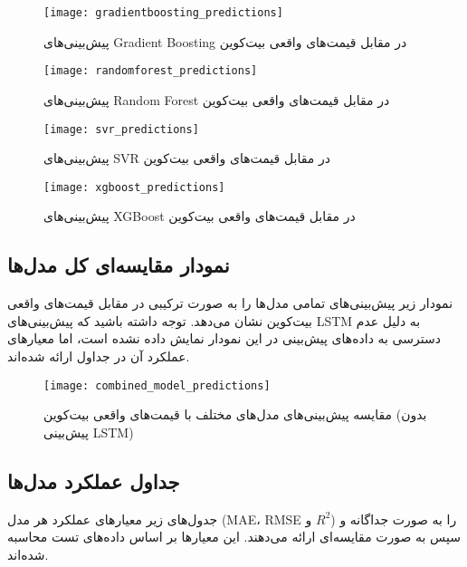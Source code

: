 \begin{figure}[H]
	\centering
	\texttt{[image: gradientboosting\_predictions]}
	\caption{پیش‌بینی‌های Gradient Boosting در مقابل قیمت‌های واقعی بیت‌کوین}
	\label{fig:gradientboosting_predictions}
\end{figure}

\begin{figure}[H]
	\centering
	\texttt{[image: randomforest\_predictions]}
	\caption{پیش‌بینی‌های Random Forest در مقابل قیمت‌های واقعی بیت‌کوین}
	\label{fig:randomforest_predictions}
\end{figure}

\begin{figure}[H]
	\centering
	\texttt{[image: svr\_predictions]}
	\caption{پیش‌بینی‌های SVR در مقابل قیمت‌های واقعی بیت‌کوین}
	\label{fig:svr_predictions}
\end{figure}

\begin{figure}[H]
	\centering
	\texttt{[image: xgboost\_predictions]}
	\caption{پیش‌بینی‌های XGBoost در مقابل قیمت‌های واقعی بیت‌کوین}
	\label{fig:xgboost_predictions}
\end{figure}



\subsection{نمودار مقایسه‌ای کل مدل‌ها}
نمودار زیر پیش‌بینی‌های تمامی مدل‌ها را به صورت ترکیبی در مقابل قیمت‌های واقعی بیت‌کوین نشان می‌دهد. توجه داشته باشید که پیش‌بینی‌های LSTM به دلیل عدم دسترسی به داده‌های پیش‌بینی در این نمودار نمایش داده نشده است، اما معیارهای عملکرد آن در جداول ارائه شده‌اند.

\begin{figure}[H]
	\centering
	\texttt{[image: combined\_model\_predictions]}
	\caption{مقایسه پیش‌بینی‌های مدل‌های مختلف با قیمت‌های واقعی بیت‌کوین (بدون پیش‌بینی LSTM)}
	\label{fig:combined_model_predictions}
\end{figure}

\subsection{جداول عملکرد مدل‌ها}
جدول‌های زیر معیارهای عملکرد هر مدل (MAE، RMSE و $ R^2 $) را به صورت جداگانه و سپس به صورت مقایسه‌ای ارائه می‌دهند. این معیارها بر اساس داده‌های تست محاسبه شده‌اند.


